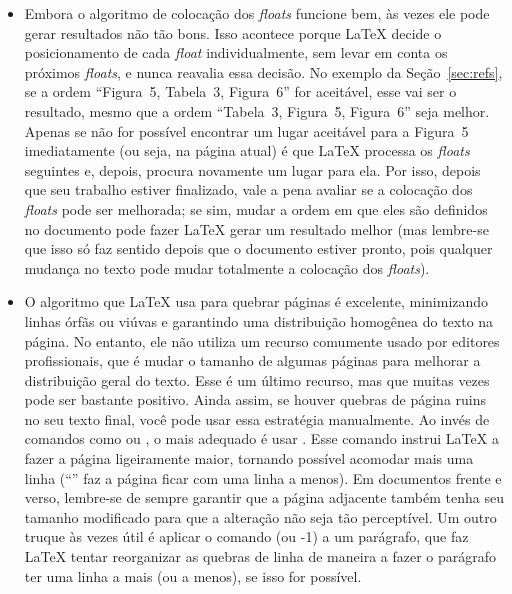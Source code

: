 \begin{itemize}
    \item Embora o algoritmo de colocação dos \emph{floats} funcione bem,
    às vezes ele pode gerar resultados não tão bons. Isso acontece porque
    \LaTeX{} decide o posicionamento de cada \emph{float} individualmente,
    sem levar em conta os próximos \emph{floats}, e nunca reavalia essa
    decisão. No exemplo da Seção~\ref{sec:refs}, se a ordem ``Figura~5,
    Tabela~3, Figura~6'' for aceitável, esse vai ser o resultado, mesmo
    que a ordem ``Tabela~3, Figura~5, Figura~6'' seja melhor. Apenas se
    não for possível encontrar um lugar aceitável para a Figura~5
    imediatamente (ou seja, na página atual) é que \LaTeX{} processa os
    \emph{floats} seguintes e, depois, procura novamente um lugar para ela.
    Por isso, depois que seu trabalho estiver finalizado, vale a pena
    avaliar se a colocação dos \emph{floats} pode ser melhorada; se sim,
    mudar a ordem em que eles são definidos no documento pode fazer \LaTeX{}
    gerar um resultado melhor (mas lembre-se que isso só faz sentido depois
    que o documento estiver pronto, pois qualquer mudança no texto pode
    mudar totalmente a colocação dos \emph{floats}).

    \item O algoritmo que \LaTeX{} usa para quebrar páginas é excelente,
    minimizando linhas órfãs ou viúvas e garantindo uma distribuição
    homogênea do texto na página. No entanto, ele não utiliza um recurso
    comumente usado por editores profissionais, que é mudar o tamanho de
    algumas páginas para melhorar a distribuição geral do texto. Esse é
    um último recurso, mas que muitas vezes pode ser bastante positivo.
    Ainda assim, se houver quebras de página ruins no seu texto final, você
    pode usar essa estratégia manualmente. Ao invés de comandos como
     ou , o mais adequado é usar
    . Esse comando instrui
    \LaTeX{} a fazer a página ligeiramente maior, tornando possível
    acomodar mais uma linha (``'' faz a página
    ficar com uma linha a menos). Em documentos frente e verso, lembre-se
    de sempre garantir que a página adjacente também tenha seu tamanho
    modificado para que a alteração não seja tão perceptível. Um outro
    truque às vezes útil é aplicar o comando  (ou -1)
    a um parágrafo, que faz \LaTeX{} tentar reorganizar as quebras de
    linha de maneira a fazer o parágrafo ter uma linha a mais (ou a menos),
    se isso for possível.


\end{itemize}
